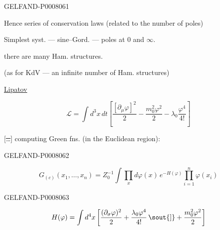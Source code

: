 \begin{GelfandAdjacentEvidence}{GELFAND-P000806}{1}

Hence series of conservation laws (related to the number of poles)


Simplest syst. --- sine–Gord. --- poles at \(0\) and \(\infty\).

 there are many Ham. structures.

(as for KdV --- an infinite number of Ham. structures)

\underline{\underline{Lipatov}}


\begin{center}
\end{center}
\begin{equation*}
\mathcal L=\int d^3x\,dt\left[
\frac{[\partial_\mu\varphi]^2}{2}
-\frac{m_0^2\varphi^2}{2}
-\lambda_0\frac{\varphi^4}{4!}\right]
\tag{1}
\end{equation*}

 [\sout{\ldots}] computing Green fns. (in the Euclidean region):
\end{GelfandAdjacentEvidence}
\begin{GelfandAdjacentEvidence}{GELFAND-P000806}{2}

\begin{equation*}
G_{(c)}(x_1,\ldots,x_n)
=Z_0^{-1}\int\prod_x d\varphi(x)\,e^{-H(\varphi)}
\prod_{i=1}^{n}\varphi(x_i)
\tag{2}
\end{equation*}
\end{GelfandAdjacentEvidence}
\begin{GelfandAdjacentEvidence}{GELFAND-P000806}{3}

\[
H(\varphi)=\int d^4x\left[
\frac{(\partial_\sigma\varphi)^2}{2}
+\frac{\lambda_0\varphi^4}{4!}\,\text{\sout{]}}
+\frac{m_0^2\varphi^2}{2}\right]
\]
\end{GelfandAdjacentEvidence}
